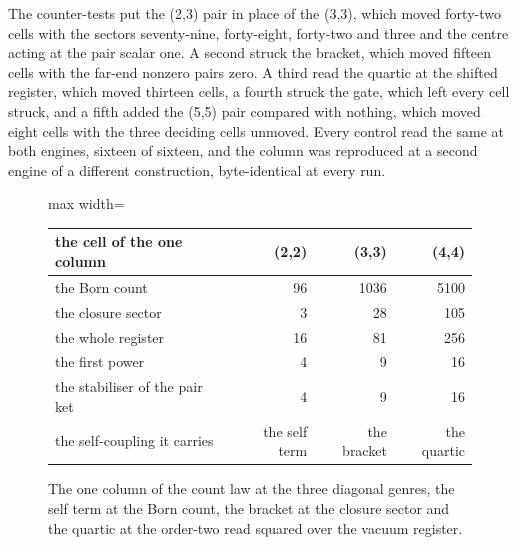 \begin{chproof}
The counter-tests put the (2,3) pair in place of the (3,3), which moved forty-two cells with the sectors seventy-nine, forty-eight, forty-two and three and the centre acting at the pair scalar one. A second struck the bracket, which moved fifteen cells with the far-end nonzero pairs zero. A third read the quartic at the shifted register, which moved thirteen cells, a fourth struck the gate, which left every cell struck, and a fifth added the (5,5) pair compared with nothing, which moved eight cells with the three deciding cells unmoved. Every control read the same at both engines, sixteen of sixteen, and the column was reproduced at a second engine of a different construction, byte-identical at every run.
\end{chproof}
\begin{figure}[h]\centering
\begin{adjustbox}{max width=\linewidth}\begin{tabular}{lrrr}\toprule
the cell of the one column & (2,2) & (3,3) & (4,4) \\ \midrule
the Born count & 96 & 1036 & 5100 \\
the closure sector & 3 & 28 & 105 \\
the whole register & 16 & 81 & 256 \\
the first power & 4 & 9 & 16 \\
the stabiliser of the pair ket & 4 & 9 & 16 \\
the self-coupling it carries & the self term & the bracket & the quartic \\ \bottomrule
\end{tabular}\end{adjustbox}
\caption{The one column of the count law at the three diagonal genres, the self term at the Born count, the bracket at the closure sector and the quartic at the order-two read squared over the vacuum register.}
\end{figure}
